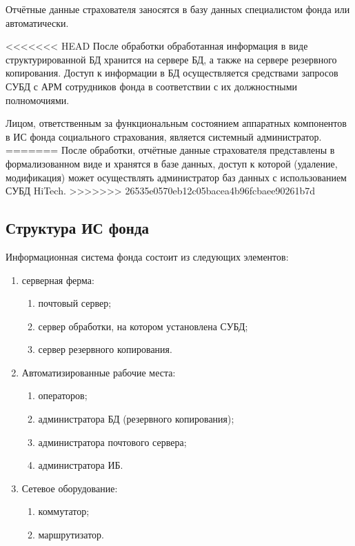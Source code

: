 \point Отчётные данные страхователя заносятся в базу данных специалистом фонда или автоматически.

<<<<<<< HEAD
\point После обработки обработанная информация в виде
структурированной БД хранится на сервере БД, а также на сервере
резервного копирования. Доступ к информации в БД осуществляется
средствами запросов СУБД с АРМ сотрудников фонда в соответствии с их
должностными полномочиями.

\point Лицом, ответственным за функциональным состоянием аппаратных
компонентов в ИС фонда социального страхования, является системный
администратор.
=======
\point После обработки, отчётные данные страхователя представлены в формализованном виде и хранятся в базе данных, доступ к которой (удаление, модификация) может осуществлять администратор баз данных с использованием СУБД HiTech.
>>>>>>> 26535e0570eb12c05bacea4b96fcbaee90261b7d

\subsection{Структура ИС фонда}

\point Информационная система фонда состоит из следующих элементов:

\begin{enumerate}
\item серверная ферма:
  \begin{enumerate}
  \item почтовый сервер;
  \item сервер обработки, на котором установлена СУБД;
  \item сервер резервного копирования.
  \end{enumerate}
\item Автоматизированные рабочие места:
  \begin{enumerate}
  \item операторов;
  \item администратора БД (резервного копирования);
  \item администратора почтового сервера;
  \item администратора ИБ.
  \end{enumerate}
\item Сетевое оборудование:
  \begin{enumerate}
  \item коммутатор;
  \item маршрутизатор.
  \end{enumerate}
\end{enumerate}

